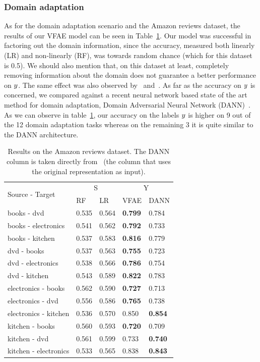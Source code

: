 \subsubsection{Domain adaptation}
As for the domain adaptation scenario and the Amazon reviews dataset, the results of our VFAE model can be seen in Table~\ref{tab:amazon_results}. Our model was successful in factoring out the domain information, since the accuracy, measured both linearly (LR) and non-linearly (RF), was towards random chance (which for this dataset is 0.5).  We should also mention that, on this dataset at least, completely removing information about the domain does not guarantee a better performance on $\*y$. The same effect was also observed by~\cite{2015arXiv150507818G} and~\cite{chen2012marginalized}. As far as the accuracy on $\*y$ is concerned, we compared against a recent neural network based state of the art method for domain adaptation, Domain Adversarial Neural Network (DANN)~\citep{2015arXiv150507818G}. As we can observe in table~\ref{tab:amazon_results}, our accuracy on the labels $\*y$ is higher on 9 out of the 12 domain adaptation tasks whereas on the remaining 3 it is quite similar to the DANN architecture. 

\begin{table}[ht]
	\caption {Results on the Amazon reviews dataset. The DANN column is taken directly from~\cite{2015arXiv150507818G} (the column that uses the original representation as input).}
	\centering
	\label{tab:amazon_results}
	\begin{center}
		\begin{tabular}{l|l|l|l|l}
			\hline
			\multirow{2}{*}{Source - Target}  & \multicolumn{2}{c|}{S}  & \multicolumn{2}{c}{Y}  \\\cline{2-5}
			& RF & LR & VFAE & DANN \\\hline
			books - dvd & 0.535 & 0.564 & \textbf{0.799} & 0.784 \\ 
			books - electronics & 0.541 & 0.562 & \textbf{0.792} & 0.733 \\
			books - kitchen & 0.537 & 0.583 &  \textbf{0.816} & 0.779 \\
			dvd - books & 0.537 & 0.563 & \textbf{0.755} & 0.723 \\
			dvd - electronics & 0.538 & 0.566 & \textbf{0.786} & 0.754\\
			dvd - kitchen & 0.543 & 0.589 &  \textbf{0.822} & 0.783\\
			electronics - books & 0.562 & 0.590  & \textbf{0.727} & 0.713\\
			electronics - dvd & 0.556 & 0.586 & \textbf{0.765} & 0.738\\
			electronics - kitchen & 0.536 & 0.570 & 0.850 & \textbf{0.854}\\ 
			kitchen - books & 0.560 & 0.593 & \textbf{0.720} & 0.709  \\
			kitchen - dvd & 0.561 & 0.599 & 0.733 & \textbf{0.740} \\
			kitchen - electronics & 0.533 & 0.565  & 0.838 & \textbf{0.843} \\
			\hline
		\end{tabular}
		\end{center}
\end{table}

